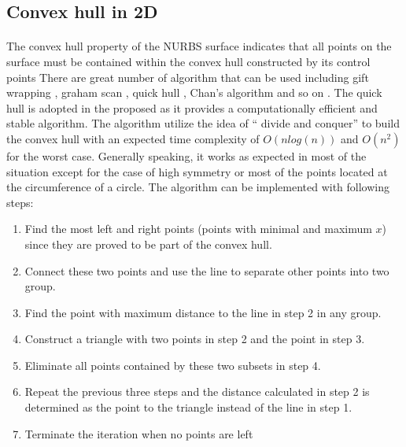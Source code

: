 \subsection{Convex hull in 2D}
\label{qdt_sc:convex_hull}
\paragraph{}
The convex hull property of the NURBS surface indicates that all points on the surface must be contained within the convex hull constructed by its control points \cite{SELIMOVIC2009772}
There are great number of algorithm that can be used including gift wrapping \cite{Cormen:2009:IAT:1614191}, graham scan \cite{ANDERSON197853}, quick hull \cite{Barber:1996:QAC:235815.235821}, Chan's algorithm \cite{Chan1996} and so on \cite{doi:10.1137/0215021, ANDREW1979216}.
The quick hull is adopted in the proposed as it provides a computationally efficient and stable algorithm.
The algorithm utilize the idea of `` divide and conquer'' to build the convex hull with an expected time complexity of $O(nlog(n))$ and  $O(n^2)$ for the worst case.
Generally speaking, it works as expected in most of the situation except for the case of high symmetry or most of the points located at the circumference of a circle.
The algorithm can be implemented with following steps:
\begin{enumerate}
    \item Find the most left and right points (points with minimal and maximum $x$) since they are proved to be part of the convex hull.
    \item Connect these two points and use the line to separate other points into two group.
    \item Find the point with maximum distance to the line in step 2 in any group.
    \item Construct a triangle with two points in step 2 and the point in step 3.
    \item Eliminate all points contained by these two subsets in step 4.
    \item Repeat the previous three steps and the distance calculated in step 2 is determined as the point to the triangle instead of the line in step 1.
    \item Terminate the iteration when no points are left
\end{enumerate}